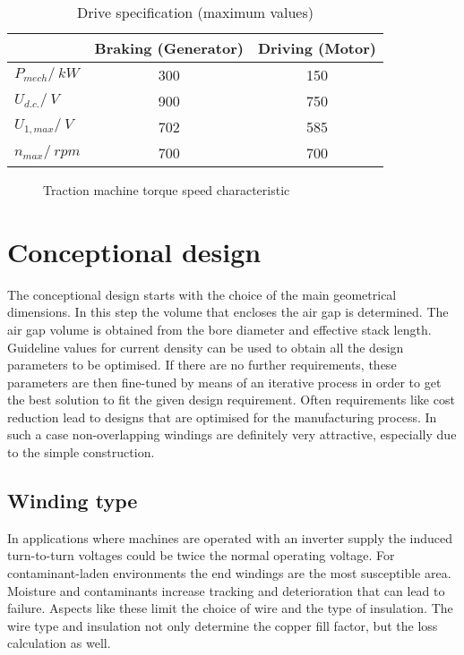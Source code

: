 \begin{table}[htbp]
	\centering
	\caption{Drive specification (maximum values)}
		\begin{tabular}{|l|c|c|}\cline{2-3}
			\multicolumn{1}{c|}{}& Braking (Generator) & Driving (Motor) \\
			\hline
			$P_{mech}/\SI{}{kW}$ & 300 & 150 \\
			$U_{d.c.}/\SI{}{V}$  & 900 & 750 \\
			$U_{1,max}/\SI{}{V}$ & 702 & 585 \\
			$n_{max}/\SI{}{rpm}$ & 700 & 700 \\
			\hline
		\end{tabular}
	\label{tab:DriveSpecification}
\end{table}
\begin{figure}[htbp]
	\centering
		
	\caption{Traction machine torque speed characteristic}
	\label{fig:torq_speed}
\end{figure}

\section{Conceptional design}
The conceptional design starts with the choice of the main geometrical dimensions. In this step the volume that encloses the air gap is determined. The air gap volume is obtained from the bore diameter and effective stack length. Guideline values for current density can be used to obtain all the design parameters to be optimised. 
If there are no further requirements, these parameters are then fine-tuned by means of an iterative process in order to get the best solution to fit the given design requirement.    
Often requirements like cost reduction lead to designs that are optimised for the manufacturing process. In such a case non-overlapping windings are definitely very attractive, especially due to the simple construction. 

\subsection{Winding type}
In applications where machines are operated with an inverter supply the induced turn-to-turn voltages could be twice the normal operating voltage. For contaminant-laden environments the end windings are the most susceptible area. Moisture and contaminants increase tracking and deterioration that can lead to failure. Aspects like these limit the choice of wire and the type of insulation. The wire type and insulation not only determine the copper fill factor, but the loss calculation as well.

